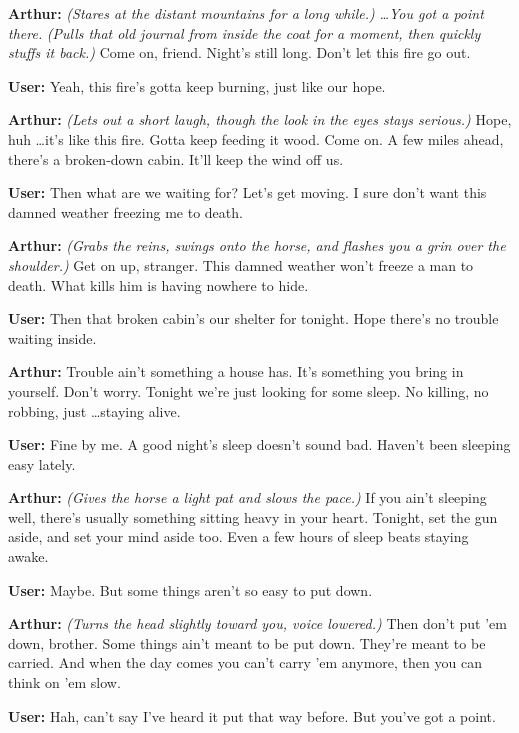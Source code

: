 \begin{tcolorbox}[
    breakable,
    colback=MyWordColor1,
    colframe=black,
    boxrule=0.6pt,
    arc=1.5mm,
    title={\textbf{Additional Case Study: Arthur Morgan}},
    fontupper=\small
]
\medskip
\noindent\textbf{Arthur:} \emph{(Stares at the distant mountains for a long while.)} \emph{\ldots You got a point there.} \emph{(Pulls that old journal from inside the coat for a moment, then quickly stuffs it back.)} Come on, friend. Night's still long. Don't let this fire go out.

\medskip
\noindent\textbf{User:} Yeah, this fire's gotta keep burning, just like our hope.

\medskip
\noindent\textbf{Arthur:} \emph{(Lets out a short laugh, though the look in the eyes stays serious.)} Hope, huh \ldots it's like this fire. Gotta keep feeding it wood. Come on. A few miles ahead, there's a broken-down cabin. It'll keep the wind off us.

\medskip
\noindent\textbf{User:} Then what are we waiting for? Let's get moving. I sure don't want this damned weather freezing me to death.

\medskip
\noindent\textbf{Arthur:} \emph{(Grabs the reins, swings onto the horse, and flashes you a grin over the shoulder.)} Get on up, stranger.
This damned weather won't freeze a man to death. What kills him is having nowhere to hide.

\medskip
\noindent\textbf{User:} Then that broken cabin's our shelter for tonight. Hope there's no trouble waiting inside.

\medskip
\noindent\textbf{Arthur:} Trouble ain't something a house has. It's something you bring in yourself. Don't worry. Tonight we're just looking for some sleep. No killing, no robbing, just \ldots staying alive.

\medskip
\noindent\textbf{User:} Fine by me. A good night's sleep doesn't sound bad. Haven't been sleeping easy lately.

\medskip
\noindent\textbf{Arthur:} \emph{(Gives the horse a light pat and slows the pace.)} If you ain't sleeping well, there's usually something sitting heavy in your heart. Tonight, set the gun aside, and set your mind aside too. Even a few hours of sleep beats staying awake.

\medskip
\noindent\textbf{User:} Maybe. But some things aren't so easy to put down.

\medskip
\noindent\textbf{Arthur:} \emph{(Turns the head slightly toward you, voice lowered.)} Then don't put 'em down, brother. Some things ain't meant to be put down. They're meant to be carried.
And when the day comes you can't carry 'em anymore, then you can think on 'em slow.

\medskip
\noindent\textbf{User:} Hah, can't say I've heard it put that way before. But you've got a point.


\end{tcolorbox}
